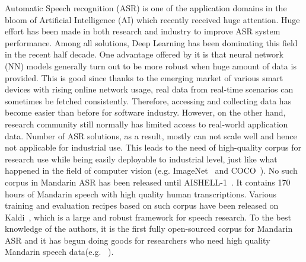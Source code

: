 \documentclass[a4paper]{article}
\begin{document}
Automatic Speech recognition (ASR) is one of the application domains in the bloom of Artificial
Intelligence (AI) which recently received huge attention. Huge effort has been made in both research and industry
to improve ASR system performance. Among all solutions, Deep Learning has been dominating
this field in the recent half decade. One advantage offered by it is that neural network (NN) models generally turn out to be more robust when
huge amount of data is provided. This is good since thanks to the emerging market of various smart devices with rising online network usage, real data from
real-time scenarios can sometimes be fetched consistently. Therefore, accessing and 
collecting data has become easier than before for software industry.
However, on the other hand, research community still normally has limited access to real-world
application data. Number of ASR solutions, as a result, mostly can not scale well and hence not applicable for industrial use. This leads to the need of high-quality corpus for research use while being easily deployable to industrial level, just like what happened in the field of computer vision (e.g. ImageNet~\cite{imagenet} and COCO~\cite{coco}). No such corpus in Mandarin ASR has been released until AISHELL-1~\cite{aishell1}.
It contains 170 hours of Mandarin speech with high quality human transcriptions. Various training and evaluation recipes based on such corpus have been released on Kaldi~\cite{kaldi}, which is a large and robust framework for speech research. To the best knowledge of the authors, it is the first fully open-sourced corpus for Mandarin ASR and
it has begun doing goods for researchers who need high quality Mandarin speech data(e.g. ~\cite{do2017, do2018_1, do2018_2}).

\end{document}
